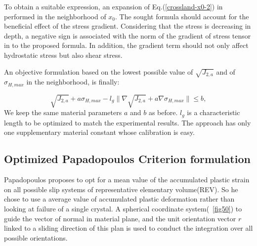 \documentclass[3p,times,procedia,number]{elsarticle}
\newcommand{\figref}[1]{\figurename~\ref{#1}}
\begin{document}
To obtain a suitable expression, an expansion of Eq.(\ref{crossland-x0-2}) in performed in the neighborhood of ${x_0}$. The sought formula should account for the beneficial effect of the stress gradient. Considering that the stress is decreasing in depth, a negative sign is associated with the norm of the gradient of stress tensor in to the proposed formula. In addition, the gradient term should not only affect hydrostatic stress but also shear stress.

An objective formulation based on the lowest possible value of $\sqrt{J_{2,a}}$ and of $\sigma_{H,max}$ in the neighborhood, is finally:

\begin{equation}
\sqrt{J_{2,a}}+a\sigma_{H,max}-l_g\parallel{\nabla\sqrt{J_{2,a}}}+a\nabla{\sigma_{H,max}}\parallel\leqslant b ,
\label{modified Crossland}
\end{equation}
We keep the same material parameters $a$ and $b$ as before. $l_g$ is a characteristic length to be optimized to match the experimental results. The approach has only one supplementary material constant whose calibration is easy.

\subsection{Optimized Papadopoulos Criterion formulation}
Papadopoulos\cite{papadopoulos1993fatigue} proposes to opt for a mean value of the accumulated plastic strain on all possible slip systems of representative elementary volume(REV). So he chose to use a average value  of accumulated plastic deformation rather than looking at failure of a single crystal. A spherical coordinate system(\figref{fig50}) to guide the vector of normal in material plane, and the unit orientation vector $r$ linked to a sliding direction of this plan is used to conduct the integration over all possible orientations.
\end{document}
